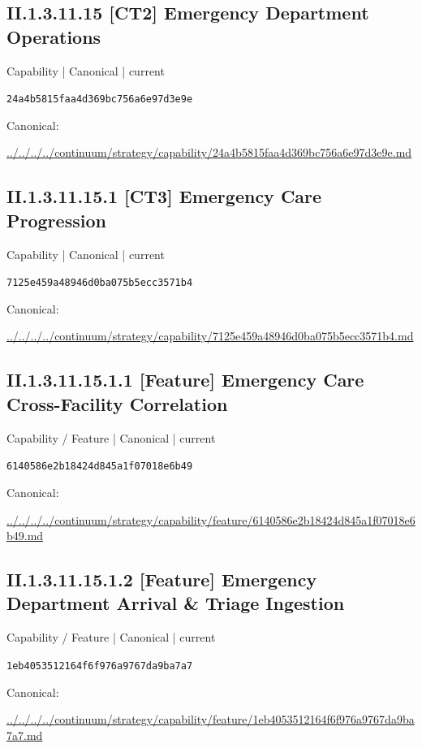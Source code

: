 \documentclass[10pt,a4paper]{article}
\begin{document}
\subsection*{II.1.3.11.15 [CT2] Emergency Department Operations}
{\small Capability | Canonical | current}\par
\texttt{24a4b5815faa4d369bc756a6e97d3e9e}\par
Canonical: \par
{\footnotesize\url{../../../../continuum/strategy/capability/24a4b5815faa4d369bc756a6e97d3e9e.md}}\par
\subsection*{II.1.3.11.15.1 [CT3] Emergency Care Progression}
{\small Capability | Canonical | current}\par
\texttt{7125e459a48946d0ba075b5ecc3571b4}\par
Canonical: \par
{\footnotesize\url{../../../../continuum/strategy/capability/7125e459a48946d0ba075b5ecc3571b4.md}}\par
\subsection*{II.1.3.11.15.1.1 [Feature] Emergency Care Cross-Facility Correlation}
{\small Capability / Feature | Canonical | current}\par
\texttt{6140586e2b18424d845a1f07018e6b49}\par
Canonical: \par
{\footnotesize\url{../../../../continuum/strategy/capability/feature/6140586e2b18424d845a1f07018e6b49.md}}\par
\subsection*{II.1.3.11.15.1.2 [Feature] Emergency Department Arrival \& Triage Ingestion}
{\small Capability / Feature | Canonical | current}\par
\texttt{1eb4053512164f6f976a9767da9ba7a7}\par
Canonical: \par
{\footnotesize\url{../../../../continuum/strategy/capability/feature/1eb4053512164f6f976a9767da9ba7a7.md}}\par
\end{document}
